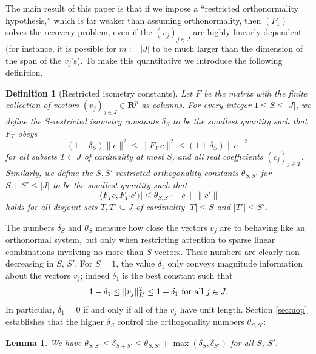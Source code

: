 \documentclass[11pt]{article}
\def\R{{{\mathbf{R}}}} %
\def\emph#1{{\it #1}} \def\textbf#1{{\bf #1}}
\newcommand{\<}{\langle}
\renewcommand{\>}{\rangle}
\newtheorem{lemma}[theorem]{Lemma}
\newtheorem{definition}[theorem]{Definition}
\numberwithin{equation}{section}
\begin{document}
The main result of this paper is that if we impose a ``restricted
orthonormality hypothesis,'' which is far weaker than assuming
orthonormality, then $(P_1)$ solves the recovery problem, even if the
$(v_j)_{j \in J}$ are highly linearly dependent (for instance, it is
possible for $m := |J|$ to be much larger than the dimension of
the span of the $v_j$'s).  To make this quantitative we introduce the
following definition.
\begin{definition}[Restricted isometry constants]  
  Let $F$ be the matrix with the finite collection of vectors
  $(v_j)_{j \in J} \in \R^p$ as columns. For every integer $1 \leq S
  \leq |J|$, we define the \emph{$S$-restricted isometry constants}
  $\delta_S$ to be the smallest quantity such that $F_T$ obeys
\begin{equation}\label{frame}
(1-\delta_S) \|c\|^2 \leq \|F_T \, c\|^2 \leq (1 + \delta_S) \|c\|^2
 \end{equation}
 for all subsets $T \subset J$ of cardinality at most $S$, and all
 real coefficients $(c_j)_{j \in T}$.  Similarly, we define the
 \emph{$S,S'$-restricted orthogonality constants} $\theta_{S,S'}$ for
 $S+S' \leq |J|$ to be the smallest quantity such that 
\begin{equation}\label{ortho}
 |\langle F_T c, F_{T'} c' \rangle|  \leq \theta_{S,S'} \cdot  
\|c\| \, \|c'\| 
 \end{equation}
 holds for all \emph{disjoint} sets $T, T' \subseteq J$ of cardinality
 $|T| \leq S$ and $|T'| \leq S'$.
\end{definition}

The numbers $\delta_S$ and $\theta_S$ measure how close the vectors
$v_j$ are to behaving like an orthonormal system, but only when
restricting attention to sparse linear combinations involving no more
than $S$ vectors.  These numbers are clearly non-decreasing in $S$,
$S'$.  For $S = 1$, the value $\delta_1$ only conveys magnitude
information about the vectors $v_j$; indeed $\delta_1$ is the best
constant such that
\begin{equation}\label{length}
 1 - \delta_1 \leq \|v_j \|_H^2 \leq 1 + \delta_1 \hbox{ for all } j \in J.
\end{equation}
In particular, $\delta_1 = 0$ if and only if all of the $v_j$ have
unit length.  Section \ref{sec:uop} establishes that the higher
$\delta_S$ control the orthogonality numbers $\theta_{S,S'}$:
\begin{lemma}\label{theta-delta}  
  We have $\theta_{S,S'} \leq \delta_{S+S'} \leq \theta_{S,S'} +
  \max(\delta_S,\delta_{S'})$ for all $S$, $S'$.
\end{lemma}
\end{document}
